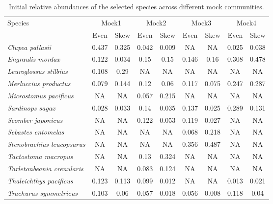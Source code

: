 \documentclass[9pt,twoside,lineno]{pnas-new}
\begin{document}
\begin{table}\centering
\caption{Initial relative abundances of the selected species across different mock communities.}
    \begin{tabular}{lcccccccc}
        \toprule
        {Species} & \multicolumn{2}{c}{Mock1} & \multicolumn{2}{c}{Mock2} & \multicolumn{2}{c}{Mock3} & \multicolumn{2}{c}{Mock4} \\
        & Even & Skew & Even & Skew & Even & Skew & Even & Skew \\
        \midrule
        \textit{Clupea pallasii}           & 0.437 & 0.325  & 0.042  & 0.009     & NA         & NA          & 0.025      & 0.038 \\
        \textit{Engraulis mordax}          & 0.122 & 0.034  & 0.15 & 0.15       & 0.146      & 0.16       & 0.308      & 0.478 \\
        \textit{Leuroglossus stilbius}     & 0.108 & 0.29   & NA & NA         & NA         & NA         & NA         & NA \\    
        \textit{Merluccius productus}      & 0.079 & 0.144  & 0.12 & 0.06       & 0.117      & 0.075      & 0.247      & 0.287 \\
        \textit{Microstomus pacificus}     & NA    & NA     & 0.057  & 0.215     & NA         & NA         & NA         & NA \\    
        \textit{Sardinops sagax}           & 0.028 & 0.033  & 0.14 & 0.035      & 0.137      & 0.025      & 0.289      & 0.131 \\
        \textit{Scomber japonicus}         & NA    & NA     & 0.122  & 0.053      & 0.119      & 0.027     & NA         & NA \\    
        \textit{Sebastes entomelas}        & NA    & NA     & NA & NA          & 0.068      & 0.218     & NA         & NA \\    
        \textit{Stenobrachius leucopsarus} & NA    & NA     & NA & NA          & 0.356      & 0.487     & NA         & NA \\    
        \textit{Tactostoma macropus}       & NA    & NA     & 0.13 & 0.324     & NA         & NA         & NA         & NA \\    
        \textit{Tarletonbeania crenularis} & NA    & NA     & 0.083  & 0.124     & NA         & NA         & NA         & NA \\    
        \textit{Thaleichthys pacificus}    & 0.123 & 0.113  & 0.099  & 0.012     & NA         & NA          & 0.013      & 0.021 \\
        \textit{Trachurus symmetricus}     & 0.103 & 0.06   & 0.057  & 0.018      & 0.056      & 0.008      & 0.118      & 0.04 \\
        \bottomrule
    \end{tabular}
\end{table}


\end{document}

